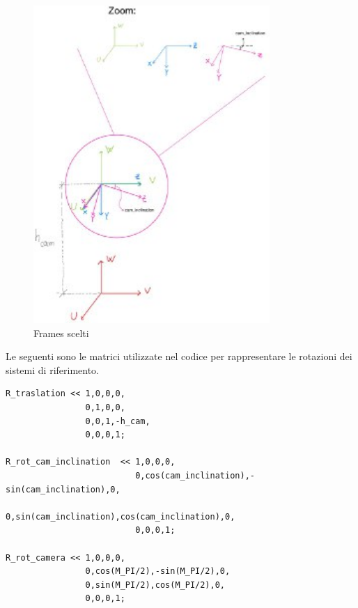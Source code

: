 \begin{figure}[H]
	\centering
	\includegraphics[width=0.8\textwidth]{Immagini/frames.jpg}
	\caption{Frames scelti}
	\label{fig:frames}
\end{figure}


Le seguenti sono le matrici utilizzate nel codice per rappresentare le rotazioni dei sistemi di riferimento.
\begin{lstlisting}
R_traslation << 1,0,0,0,
				0,1,0,0,
				0,0,1,-h_cam,
				0,0,0,1;

R_rot_cam_inclination  << 1,0,0,0,
					      0,cos(cam_inclination),-sin(cam_inclination),0,
						  0,sin(cam_inclination),cos(cam_inclination),0,
						  0,0,0,1;

R_rot_camera << 1,0,0,0,
				0,cos(M_PI/2),-sin(M_PI/2),0,
				0,sin(M_PI/2),cos(M_PI/2),0,
				0,0,0,1;
\end{lstlisting}